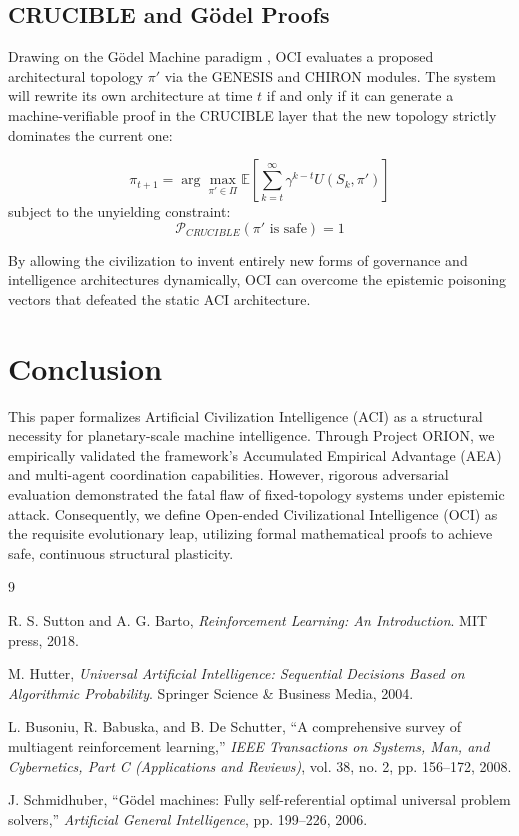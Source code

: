 \documentclass[11pt,twocolumn]{article}
\begin{document}
\subsection{CRUCIBLE and G\"odel Proofs}
Drawing on the G\"odel Machine paradigm \cite{schmidhuber2006godel}, OCI evaluates a proposed architectural topology $\pi'$ via the GENESIS and CHIRON modules. The system will rewrite its own architecture at time $t$ if and only if it can generate a machine-verifiable proof in the CRUCIBLE layer that the new topology strictly dominates the current one:

\begin{equation}
    \pi_{t+1} = \arg\max_{\pi' \in \Pi} \mathbb{E}\left[ \sum_{k=t}^{\infty} \gamma^{k-t} U(S_k, \pi') \right] 
\end{equation}
subject to the unyielding constraint:
\begin{equation}
    \mathcal{P}_{CRUCIBLE}(\pi' \text{ is safe}) = 1
\end{equation}

By allowing the civilization to invent entirely new forms of governance and intelligence architectures dynamically, OCI can overcome the epistemic poisoning vectors that defeated the static ACI architecture.

\section{Conclusion}
This paper formalizes Artificial Civilization Intelligence (ACI) as a structural necessity for planetary-scale machine intelligence. Through Project ORION, we empirically validated the framework's Accumulated Empirical Advantage (AEA) and multi-agent coordination capabilities. However, rigorous adversarial evaluation demonstrated the fatal flaw of fixed-topology systems under epistemic attack. Consequently, we define Open-ended Civilizational Intelligence (OCI) as the requisite evolutionary leap, utilizing formal mathematical proofs to achieve safe, continuous structural plasticity.


\begin{thebibliography}{9}

R. S. Sutton and A. G. Barto, \textit{Reinforcement Learning: An Introduction}. MIT press, 2018.

M. Hutter, \textit{Universal Artificial Intelligence: Sequential Decisions Based on Algorithmic Probability}. Springer Science \& Business Media, 2004.

L. Busoniu, R. Babuska, and B. De Schutter, ``A comprehensive survey of multiagent reinforcement learning,'' \textit{IEEE Transactions on Systems, Man, and Cybernetics, Part C (Applications and Reviews)}, vol. 38, no. 2, pp. 156--172, 2008.

J. Schmidhuber, ``G\"odel machines: Fully self-referential optimal universal problem solvers,'' \textit{Artificial General Intelligence}, pp. 199--226, 2006.

\end{thebibliography}
\end{document}
